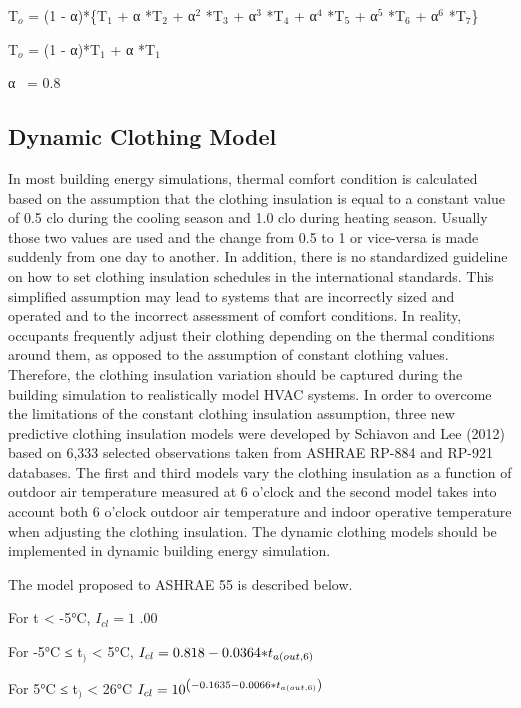 T\(_{o}\) = (1 - α)*\{T\(_{1}\) + α *T\(_{2}\) + α\(^{2}\) *T\(_{3}\) + α\(^{3}\) *T\(_{4}\) + α\(^{4}\) *T\(_{5}\) + α\(^{5}\) *T\(_{6}\) + α\(^{6}\) *T\(_{7}\)\}

T\(_{o}\) = (1 - α)*T\(_{1}\) + α *T\(_{1}\)

α~ = 0.8

\subsection{Dynamic Clothing Model}\label{dynamic-clothing-model}

In most building energy simulations, thermal comfort condition is calculated based on the assumption that the clothing insulation is equal to a constant value of 0.5 clo during the cooling season and 1.0 clo during heating season. Usually those two values are used and the change from 0.5 to 1 or vice-versa is made suddenly from one day to another. In addition, there is no standardized guideline on how to set clothing insulation schedules in the international standards. This simplified assumption may lead to systems that are incorrectly sized and operated and to the incorrect assessment of comfort conditions. In reality, occupants frequently adjust their clothing depending on the thermal conditions around them, as opposed to the assumption of constant clothing values. Therefore, the clothing insulation variation should be captured during the building simulation to realistically model HVAC systems. In order to overcome the limitations of the constant clothing insulation assumption, three new predictive clothing insulation models were developed by Schiavon and Lee (2012) based on 6,333 selected observations taken from ASHRAE RP-884 and RP-921 databases. The first and third models vary the clothing insulation as a function of outdoor air temperature measured at 6 o'clock and the second model takes into account both 6 o'clock outdoor air temperature and indoor operative temperature when adjusting the clothing insulation. The dynamic clothing models should be implemented in dynamic building energy simulation.

The model proposed to ASHRAE 55 is described below.

For t\(_{ }\) \textless{} -5°C, \({I_{cl}} = 1\) .00

For -5°C ≤ t\(_{)}\) \textless{} 5°C, \({I_{cl}} = 0.818 - 0.0364{\rm{*}}{t_{a\left( {out,6} \right)}}\)

For 5°C ≤ t\(_{)}\) \textless{} 26°C \({I_{cl}} = {10^{\left( { - 0.1635 - 0.0066{\rm{*}}{t_{a\left( {out,6} \right)}}} \right)}}\)


